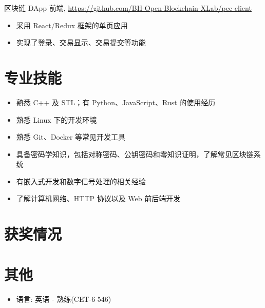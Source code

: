 \documentclass{resume}
\newcommand{\hlink}[1]{\href{#1}{#1}}
\begin{document}
\begin{onehalfspacing}
区块链 DApp 前端, \hlink{https://github.com/BH-Open-Blockchain-XLab/pec-client}
\begin{itemize}
  \item 采用 React/Redux 框架的单页应用
  \item 实现了登录、交易显示、交易提交等功能
\end{itemize}
\end{onehalfspacing}

\section{专业技能}
\begin{itemize}[parsep=0.5ex]
  \item 熟悉 C++ 及 STL；有 Python、JavaScript、Rust 的使用经历
  \item 熟悉 Linux 下的开发环境
  \item 熟悉 Git、Docker 等常见开发工具
  \item 具备密码学知识，包括对称密码、公钥密码和零知识证明，了解常见区块链系统
  \item 有嵌入式开发和数字信号处理的相关经验
  \item 了解计算机网络、HTTP 协议以及 Web 前后端开发
\end{itemize}

\section{获奖情况}

\section{其他}
\begin{itemize}[parsep=0.5ex]
  \item 语言: 英语 - 熟练(CET-6 546)
\end{itemize}
\end{document}
